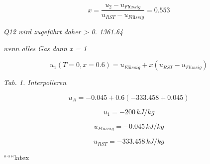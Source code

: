 \[
x = \frac{u_2 - u_{Flüssig}}{u_{RST} - u_{Flüssig}} = 0.553
\]

\textit{Q12 wird zugeführt daher > 0. 1361.64}

\textit{wenn alles Gas dann x = 1}

\[
u_1 (T = 0, x = 0.6) = u_{Flüssig} + x \left( u_{RST} - u_{Flüssig} \right)
\]

\textit{Tab. 1. Interpolieren}

\[
u_{A} = -0.045 + 0.6 \left( -333.458 + 0.045 \right)
\]

\[
u_1 = -200 \, kJ/kg
\]

\[
u_{Flüssig} = -0.045 \, kJ/kg
\]

\[
u_{RST} = -333.458 \, kJ/kg
\]

``````latex


